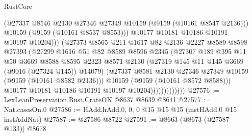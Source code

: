 \begin{lexlean}{RustCore}
\begin{coremodule}
                                  (@27337
                                    @8546
                                    @2130
                                    @27346
                                    @27349
                                    @10159
                                    (@9159 (@10161 @8547 @2136)))
                                  @10159
                                  (@9159 (@10161 @8537 @8553)))
                                @10177
                                @10181
                                @10186
                                @10191
                                @10197
                                @10204)))
                          (@27373
                            @8565
                            @211
                            @1617
                            @82
                            @2136
                            @2227
                            @8589
                            @8598
                            @27393
                            (@27299
                              @1616
                              @51
                              @82
                              @8589
                              @8596
                              @2345
                              (@27307
                                @189
                                @395
                                @11
                                @50
                                @3669
                                @8588
                                @8595
                                @2323
                                @8571
                                @2130
                                (@27319 @145 @11 @145 @3669 (@9016 (@27324 @145)) @14079)
                                (@27337
                                  @8581
                                  @2130
                                  @27346
                                  @27349
                                  @10159
                                  (@9159 (@10161 @8582 @2136)))
                                @10159
                                (@9159 (@10161 @8572 @8588)))
                              @10177
                              @10181
                              @10186
                              @10191
                              @10197
                              @10204)))))))))))))
@27576 := LexLeanPreservation.Rust.CrateOK @8637 @8639 @8641
@27577 := Nat.casesOn.{0}
@27586 := HAdd.hAdd.{0, 0, 0} @15 @15 @15 (instHAdd.{0} @15 instAddNat)
@27587 := @27586 @8722
@27591 := @8663 (@8673 (@27587 @133)) @8678

\end{coremodule}
\end{lexlean}
